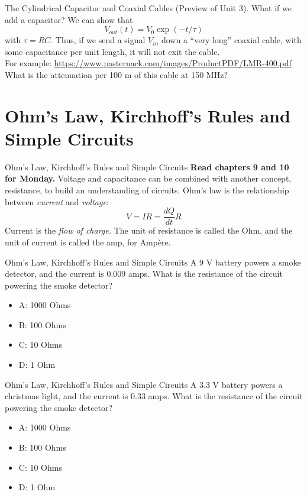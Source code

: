 \documentclass{beamer}
\begin{document}
\begin{frame}{The Cylindrical Capacitor and Coaxial Cables}
(Preview of Unit 3).  What if we add a capacitor?
We can show that
\begin{equation}
V_{out}(t) = V_0 \exp(-t/\tau)
\end{equation}
with $\tau = RC$.  Thus, if we send a signal $V_{in}$ down a ``very long'' coaxial cable, with some capacitance per unit length, it will not exit the cable. \\ \vspace{0.5cm}
For example: \url{https://www.pasternack.com/images/ProductPDF/LMR-400.pdf} \\ \vspace{0.5cm}
What is the attenuation per 100 m of this cable at 150 MHz?
\end{frame}

\section{Ohm's Law, Kirchhoff's Rules and Simple Circuits}

\begin{frame}{Ohm's Law, Kirchhoff's Rules and Simple Circuits}
\textbf{Read chapters 9 and 10 for Monday.}
Voltage and capacitance can be combined with another concept, \alert{resistance}, to build an understanding of \alert{circuits}.  Ohm's law is the relationship between \textit{current} and \textit{voltage}:
\begin{equation}
V = I R = \frac{dQ}{dt}R
\end{equation}
Current is the \textit{flow of charge.}  The unit of resistance is called the Ohm, and the unit of current is called the amp, for Amp\`{e}re.
\end{frame}

\begin{frame}{Ohm's Law, Kirchhoff's Rules and Simple Circuits}
A 9 V battery powers a smoke detector, and the current is 0.009 amps.  What is the resistance of the circuit powering the smoke detector?
\begin{itemize}
\item A: 1000 Ohms
\item B: 100 Ohms
\item C: 10 Ohms
\item D: 1 Ohm
\end{itemize}
\end{frame}

\begin{frame}{Ohm's Law, Kirchhoff's Rules and Simple Circuits}
A 3.3 V battery powers a christmas light, and the current is 0.33 amps.  What is the resistance of the circuit powering the smoke detector?
\begin{itemize}
\item A: 1000 Ohms
\item B: 100 Ohms
\item C: 10 Ohms
\item D: 1 Ohm
\end{itemize}
\end{frame}
\end{document}
